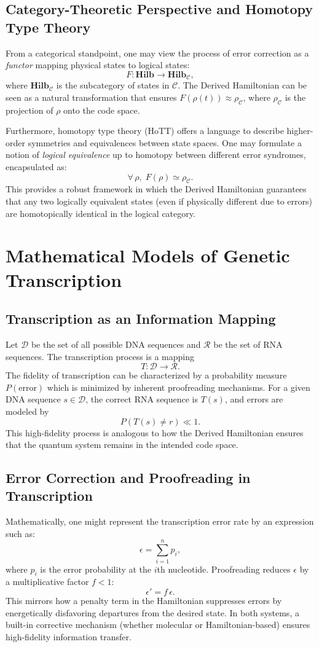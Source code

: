 \documentclass[11pt]{article}
\begin{document}
\subsection{Category-Theoretic Perspective and Homotopy Type Theory}
From a categorical standpoint, one may view the process of error correction as a \emph{functor} mapping physical states to logical states:
\[
F: \mathbf{Hilb} \to \mathbf{Hilb}_{\mathcal{C}},
\]
where $\mathbf{Hilb}_{\mathcal{C}}$ is the subcategory of states in $\mathcal{C}$. The Derived Hamiltonian can be seen as a natural transformation that ensures $F(\rho(t)) \approx \rho_{\mathcal{C}}$, where $\rho_{\mathcal{C}}$ is the projection of $\rho$ onto the code space.

Furthermore, homotopy type theory (HoTT) offers a language to describe higher-order symmetries and equivalences between state spaces. One may formulate a notion of \emph{logical equivalence} up to homotopy between different error syndromes, encapsulated as:
\[
\forall \, \rho, \; F(\rho) \simeq \rho_{\mathcal{C}}.
\]
This provides a robust framework in which the Derived Hamiltonian guarantees that any two logically equivalent states (even if physically different due to errors) are homotopically identical in the logical category.

\section{Mathematical Models of Genetic Transcription}
\subsection{Transcription as an Information Mapping}
Let $\mathcal{D}$ be the set of all possible DNA sequences and $\mathcal{R}$ be the set of RNA sequences. The transcription process is a mapping
\[
T: \mathcal{D} \to \mathcal{R}.
\]
The fidelity of transcription can be characterized by a probability measure \(P(\text{error})\) which is minimized by inherent proofreading mechanisms. For a given DNA sequence \(s \in \mathcal{D}\), the correct RNA sequence is \(T(s)\), and errors are modeled by
\[
P(T(s) \neq r) \ll 1.
\]
This high-fidelity process is analogous to how the Derived Hamiltonian ensures that the quantum system remains in the intended code space.

\subsection{Error Correction and Proofreading in Transcription}
Mathematically, one might represent the transcription error rate by an expression such as:
\[
\epsilon = \sum_{i=1}^{n} p_i,
\]
where \(p_i\) is the error probability at the \(i\)th nucleotide. Proofreading reduces \(\epsilon\) by a multiplicative factor \(f < 1\):
\[
\epsilon' = f \, \epsilon.
\]
This mirrors how a penalty term in the Hamiltonian suppresses errors by energetically disfavoring departures from the desired state. In both systems, a built-in corrective mechanism (whether molecular or Hamiltonian-based) ensures high-fidelity information transfer.
\end{document}

